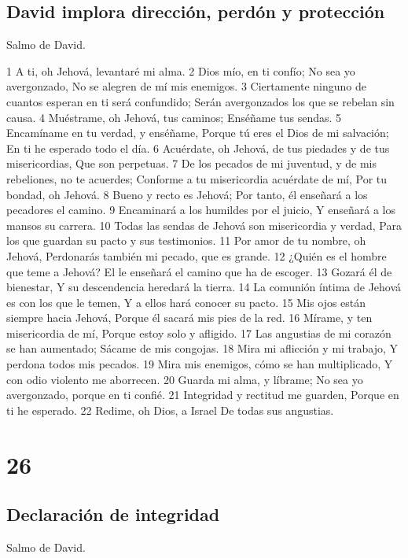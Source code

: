 \section*{David implora dirección, perdón y protección}

Salmo de David.

1 A ti, oh Jehová, levantaré mi alma.
2 Dios mío, en ti confío;
No sea yo avergonzado,
No se alegren de mí mis enemigos.
3 Ciertamente ninguno de cuantos esperan en ti será confundido;
Serán avergonzados los que se rebelan sin causa.
4 Muéstrame, oh Jehová, tus caminos;
Enséñame tus sendas.
5 Encamíname en tu verdad, y enséñame,
Porque tú eres el Dios de mi salvación;
En ti he esperado todo el día.
6 Acuérdate, oh Jehová, de tus piedades y de tus misericordias,
Que son perpetuas.
7 De los pecados de mi juventud, y de mis rebeliones, no te acuerdes;
Conforme a tu misericordia acuérdate de mí,
Por tu bondad, oh Jehová.
8 Bueno y recto es Jehová;
Por tanto, él enseñará a los pecadores el camino.
9 Encaminará a los humildes por el juicio,
Y enseñará a los mansos su carrera.
10 Todas las sendas de Jehová son misericordia y verdad,
Para los que guardan su pacto y sus testimonios.
11 Por amor de tu nombre, oh Jehová,
Perdonarás también mi pecado, que es grande.
12 ¿Quién es el hombre que teme a Jehová?
El le enseñará el camino que ha de escoger.
13 Gozará él de bienestar,
Y su descendencia heredará la tierra.
14 La comunión íntima de Jehová es con los que le temen,
Y a ellos hará conocer su pacto.
15 Mis ojos están siempre hacia Jehová,
Porque él sacará mis pies de la red.
16 Mírame, y ten misericordia de mí,
Porque estoy solo y afligido.
17 Las angustias de mi corazón se han aumentado;
Sácame de mis congojas.
18 Mira mi aflicción y mi trabajo,
Y perdona todos mis pecados.
19 Mira mis enemigos, cómo se han multiplicado,
Y con odio violento me aborrecen.
20 Guarda mi alma, y líbrame;
No sea yo avergonzado, porque en ti confié.
21 Integridad y rectitud me guarden,
Porque en ti he esperado.
22 Redime, oh Dios, a Israel
De todas sus angustias.

\chapter{26}

\section*{Declaración de integridad}

Salmo de David.

